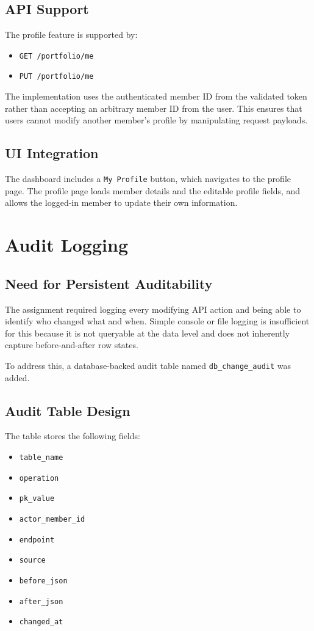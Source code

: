 \documentclass[12pt,a4paper]{article}
\begin{document}
\subsection{API Support}
The profile feature is supported by:
\begin{itemize}[leftmargin=1.5em]
    \item \texttt{GET /portfolio/me}
    \item \texttt{PUT /portfolio/me}
\end{itemize}

The implementation uses the authenticated member ID from the validated token rather than accepting an arbitrary member ID from the user. This ensures that users cannot modify another member's profile by manipulating request payloads.

\subsection{UI Integration}
The dashboard includes a \texttt{My Profile} button, which navigates to the profile page. The profile page loads member details and the editable profile fields, and allows the logged-in member to update their own information.

\section{Audit Logging}
\subsection{Need for Persistent Auditability}
The assignment required logging every modifying API action and being able to identify who changed what and when. Simple console or file logging is insufficient for this because it is not queryable at the data level and does not inherently capture before-and-after row states.

To address this, a database-backed audit table named \texttt{db\_change\_audit} was added.

\subsection{Audit Table Design}
The table stores the following fields:
\begin{itemize}[leftmargin=1.5em]
    \item \texttt{table\_name}
    \item \texttt{operation}
    \item \texttt{pk\_value}
    \item \texttt{actor\_member\_id}
    \item \texttt{endpoint}
    \item \texttt{source}
    \item \texttt{before\_json}
    \item \texttt{after\_json}
    \item \texttt{changed\_at}
\end{itemize}
\end{document}
